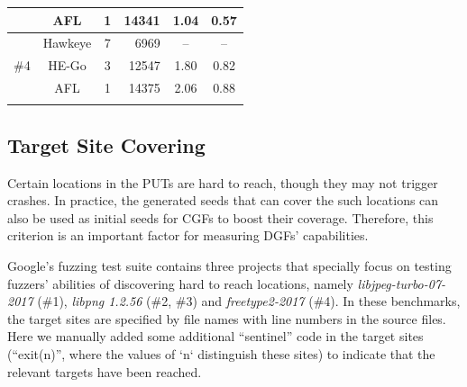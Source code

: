 \begin{table}[t]
\begin{tabular}{c|c|c|r|c|c}
        &      AFL   &        1                                              &                              14341                       &                    1.04                       &        0.57             \\ \hline
        \multirow{3}{*}{\#4} &  Hawkeye &                  7                                    &                6969                                     &                  --                 & --                             \\ \cline{2-6} 
        &      HE-Go  &       3                                               &                      12547                               &                 1.80                         &          0.82             \\ \cline{2-6} 
        &       AFL   &              1                                       &                  14375                                &             2.06                            &           0.88            \\ \thickhline
        
    \end{tabular}
\end{table} 


\subsection{Target Site Covering}\label{subsec:evalsrcloc}
Certain locations in the PUTs are hard to reach, though they may not trigger crashes.
In practice, the generated seeds that can cover the such locations can also be used as initial seeds for CGFs to boost their coverage. 
Therefore, this criterion is an important factor for measuring DGFs' capabilities. 

Google's fuzzing test suite contains three projects that specially focus on testing fuzzers' abilities of discovering hard to reach locations, namely \emph{libjpeg-turbo-07-2017} (\#1), \emph{libpng 1.2.56} (\#2, \#3) and \emph{freetype2-2017} (\#4). 
In these benchmarks, the target sites are specified by file names with line numbers in the source files. 
Here we manually added some additional ``sentinel'' code in the target sites (``exit(n)'', where the values of `n` distinguish these sites) to indicate that the relevant targets have been reached. 



